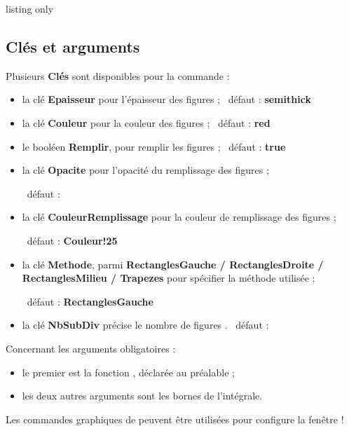 \documentclass[a4paper,french,11pt]{article}
\newcommand\ctex[1]{\tcbox[vignettelatex]{#1}}
\newcommand\Cle[1]{{\bfseries\sffamily\textlangle #1\textrangle}}
\begin{document}
\begin{PresCodeTexPL}{listing only}
\end{PresCodeTexPL}

\subsection{Clés et arguments}

\begin{cautionblock}
Plusieurs \Cle{Clés} sont disponibles pour la commande :

\begin{itemize}
	\item la clé \Cle{Epaisseur} pour l'épaisseur des \og figures \fg{} ; \hfill~défaut : \Cle{semithick}
	\item la clé \Cle{Couleur} pour la couleur des \og figures \fg{} ; \hfill~défaut : \Cle{red}
	\item le booléen \Cle{Remplir}, pour remplir les \og figures \fg{} ; \hfill~défaut : \Cle{true}
	\item la clé \Cle{Opacite} pour l'opacité du remplissage des \og figures \fg{} ;
	
	\hfill~défaut : \Cle{0.25}
	\item la clé \Cle{CouleurRemplissage} pour la couleur de remplissage des \og figures \fg{} ;
	
	\hfill~défaut : \Cle{Couleur!25}
	\item la clé \Cle{Methode}, parmi \Cle{RectanglesGauche / RectanglesDroite / RectanglesMilieu / Trapezes} pour spécifier la méthode utilisée ;
	
	\hfill~défaut : \Cle{RectanglesGauche}
	\item la clé \Cle{NbSubDiv} précise le nombre de \og figures \fg{}. \hfill~défaut : \Cle{10}
\end{itemize}

\smallskip

Concernant les arguments obligatoires :

\begin{itemize}
	\item le premier est la fonction , déclarée au préalable ;
	\item les deux autres arguments sont les bornes de l'intégrale.
\end{itemize}

Les commandes graphiques de \ctex{Proflycee} peuvent être utilisées pour configure la fenêtre !
\end{cautionblock}
\end{document}
